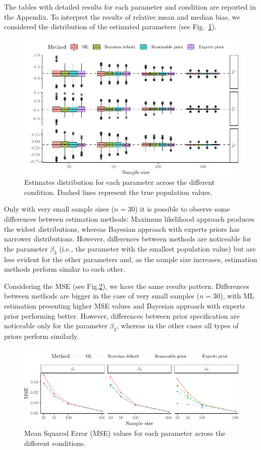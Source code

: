 \documentclass[graybox]{svmult}
\begin{document}
The tables with detailed results for each parameter and condition are reported in the Appendix. To interpret the results of relative mean and median bias, we considered the distribution of the estimated parameters (see Fig.~\ref{fig:boxplots}). 
\begin{figure}[b]
	\sidecaption
	\includegraphics[width = .9\textwidth]{figure/Plot_boxplots}
	\caption{Estimates distribution for each parameter across the different condition. Dashed lines represent the true population values.}
	\label{fig:boxplots}
\end{figure}
Only with very small sample sizes ($n=30$) it is possible to observe some differences between estimation methods: Maximum likelihood approach produces the widest distributions, whereas Bayesian approach with experts priors has narrower distributions. However, differences between methods are noticeable for the parameter $\beta_3$ (i.e., the parameter with the smallest population value) but are less evident for the other parameters and, as the sample size increases, estimation methods perform similar to each other.

Considering the MSE (see Fig.\ref{fig:mse}), we have the same results pattern. Differences between methods are bigger in the case of very small samples ($n=30$), with ML estimation presenting higher MSE values and Bayesian approach with experts prior performing better. However, differences between prior specification are noticeable only for the parameter $\beta_3$, whereas in the other cases all types of priors perform similarly.
\begin{figure}[t]
	\sidecaption
	\includegraphics[width = .9\textwidth]{figure/Plot_MSE}
	\caption{Mean Squared Error (MSE) values for each parameter across the different conditions.}
	\label{fig:mse}
\end{figure}
\end{document}
